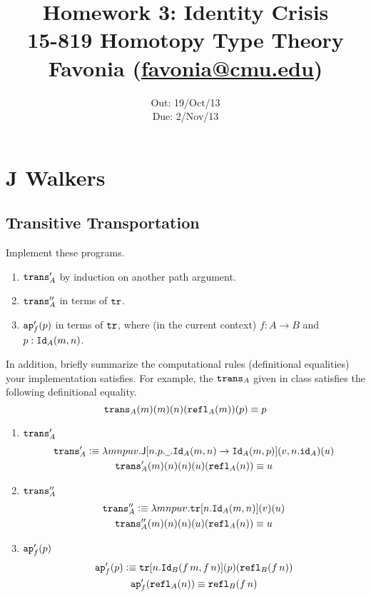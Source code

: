 \documentclass[12pt]{article}
\title{\Large\textbf{
  Homework 3: Identity Crisis}
\normalsize\\
15-819 Homotopy Type Theory\\
Favonia (\href{mailto:favonia@cmu.edu}{favonia@cmu.edu})}
\author{}
\date{%
Out: 19/Oct/13\\
Due: 2/Nov/13
}
\newcommand{\cut}[1]{}
\newcommand{\marksolution}[1]{\color{FireBrick}#1\normalcolor}%
\newcommand{\marksolution}[1]{\cut{#1}}%
\newenvironment{solution}{\trivlist \item[\hskip \labelsep{\bf
Solution:}]}{\endtrivlist}
\begin{document}
\maketitle

\section{J Walkers}

\subsection{Transitive Transportation}

\begin{task}
  Implement these programs.
  \begin{enumerate}
    \item $\mathtt{trans}'_A$ by induction on another path argument.
    \item $\mathtt{trans}''_A$ in terms of $\mathtt{tr}$.
    \item
      $\mathtt{ap}'_f(p)$ in terms of $\mathtt{tr}$,
      where (in the current context) $f : A \to B$
      and $p : \mathtt{Id}_A(m,n)$.
  \end{enumerate}
  In addition, briefly summarize the computational rules
  (definitional equalities)
  your implementation satisfies.
  For example, the $\mathtt{trans}_A$ given in class
  satisfies the following definitional equality.
  \[
    \mathtt{trans}_A(m)(m)(n)(\mathtt{refl}_A(m))(p) \equiv p
  \]
\end{task}

\marksolution{
  \begin{solution}\mbox{}
    \begin{enumerate}
      \item $\mathtt{trans}'_A$
        \begin{gather*}
          \mathtt{trans}'_A \vcentcolon\equiv \lambda mnpuv. \mathsf{J}[n.p.\underline{\hspace{0.5em}}.\mathtt{Id}_A(m,n)\to\mathtt{Id}_A(m,p)](v,n.\mathtt{id}_A)(u)
          \\
          \mathtt{trans}'_A(m)(n)(n)(u)(\mathtt{refl}_A(n)) \equiv u
        \end{gather*}
      \item $\mathtt{trans}''_A$
        \begin{gather*}
          \mathtt{trans}''_A \vcentcolon\equiv \lambda mnpuv. \mathtt{tr}[n.\mathtt{Id}_A(m,n)](v)(u)
          \\
          \mathtt{trans}''_A(m)(n)(n)(u)(\mathtt{refl}_A(n)) \equiv u
        \end{gather*}
      \item $\mathtt{ap}'_f(p)$
        \begin{gather*}
          \mathtt{ap}'_f(p) \vcentcolon\equiv \mathtt{tr}[n.\mathtt{Id}_B(f\,m,f\,n)](p)(\mathtt{refl}_B(f\,n))
          \\
          \mathtt{ap}'_f(\mathtt{refl}_A(n)) \equiv \mathtt{refl}_B(f\,n)
        \end{gather*}
    \end{enumerate}
  \end{solution}
}
\end{document}
